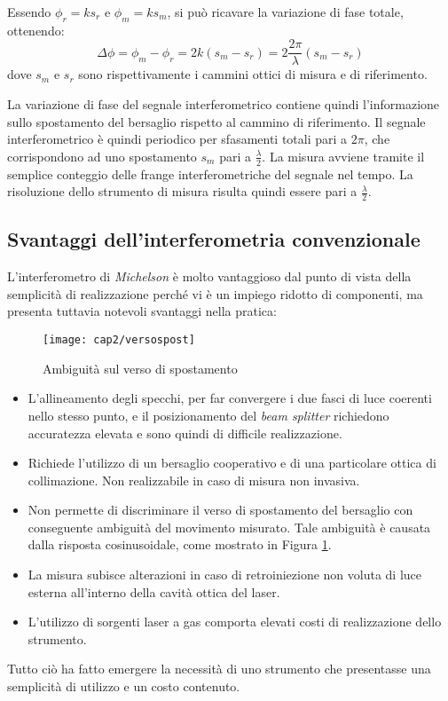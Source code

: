 Essendo $\phi_r= ks_r$ e $\phi_m = ks_m$, si può ricavare la variazione di fase totale, ottenendo:
\begin{equation}
	\Delta \phi=\phi_m-\phi_r=2k(s_m-s_r)=2\frac{2\pi}{\lambda}(s_m-s_r)
\end{equation}
dove $s_m$ e $s_r$ sono rispettivamente i cammini ottici di misura e di riferimento.

La variazione di fase del segnale interferometrico contiene quindi l'informazione sullo spostamento del bersaglio rispetto al cammino di riferimento. Il segnale interferometrico è quindi periodico per sfasamenti totali pari a $2\pi$, che corrispondono ad uno spostamento $s_m$ pari a $\frac{\lambda}{2}$. La misura avviene tramite il semplice conteggio delle frange interferometriche del segnale nel tempo. La risoluzione dello strumento di misura risulta quindi essere pari a  $\frac{\lambda}{2}$.

\subsection{Svantaggi dell'interferometria convenzionale} 
L'interferometro di \textit{Michelson} è molto vantaggioso dal punto di vista della semplicità di realizzazione perché vi è un impiego ridotto di componenti, ma presenta tuttavia notevoli svantaggi nella pratica:
\begin{figure}  
  \begin{center}
    \texttt{[image: cap2/versospost]}
    \caption{Ambiguità sul verso di spostamento}
    \label{versospost}
  \end{center}
\end{figure}
\begin{itemize}
	\item L'allineamento degli specchi, per far convergere i due fasci di luce coerenti nello stesso punto, e il posizionamento del \textit{beam splitter} richiedono accuratezza elevata e sono quindi di difficile realizzazione.
	\item Richiede l'utilizzo di un bersaglio cooperativo e di una particolare ottica di collimazione. Non realizzabile in caso di misura non invasiva.
	\item Non permette di discriminare il verso di spostamento del bersaglio con conseguente ambiguità del movimento misurato. Tale ambiguità è causata dalla risposta cosinusoidale, come mostrato in Figura \ref{versospost}.
	\item La misura subisce alterazioni in caso di retroiniezione non voluta di luce esterna all'interno della cavità ottica del laser.
	\item L'utilizzo di sorgenti laser a gas comporta elevati costi di realizzazione dello strumento.
\end{itemize}
Tutto ciò ha fatto emergere la necessità di uno strumento che presentasse una semplicità di utilizzo e un costo contenuto.

